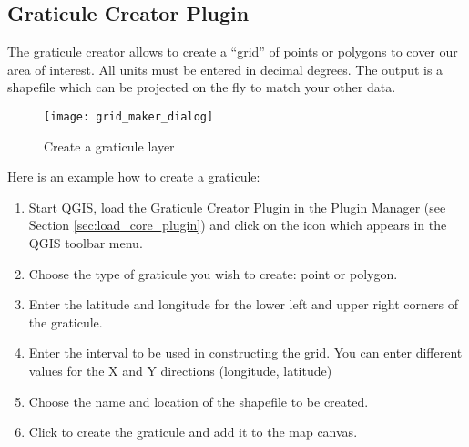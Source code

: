 
\subsection{Graticule Creator Plugin}


The graticule creator allows to create a ``grid'' of points or polygons to cover our area of interest.
All units must be entered in decimal degrees.
The output is a shapefile which can be projected on the fly to match your other data.

\begin{figure}[ht]
\begin{center}
  \caption{Create a graticule layer \nixcaption}\label{fig:graticule}\smallskip
  \texttt{[image: grid\_maker\_dialog]}
\end{center}
\end{figure}

Here is an example how to create a graticule:

\begin{enumerate}
\item Start QGIS, load the Graticule Creator Plugin in the Plugin Manager (see Section 
\ref{sec:load_core_plugin}) and click on the  
icon which appears in the QGIS toolbar menu.
\item Choose the type of graticule you wish to create: point or polygon.
\item Enter the latitude and longitude for the lower left and upper right corners of the graticule.
\item Enter the interval to be used in constructing the grid. You can enter different values for the X and Y directions (longitude, latitude)
\item Choose the name and location of the shapefile to be created.
\item Click  to create the graticule and add it to the map canvas.
\end{enumerate} 


